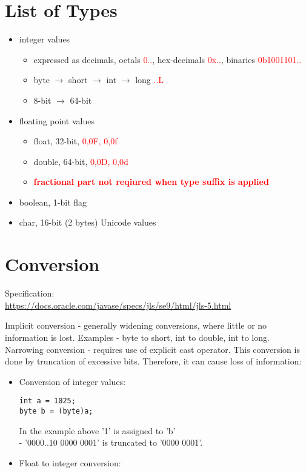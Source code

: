 \documentclass{report}
\begin{document}
\section{List of Types}
\begin{itemize}
	\item integer values
	\begin{itemize}
		\item expressed as decimals, octals \textcolor{red}{0..}, hex-decimals \textcolor{red}{0x..}, binaries \textcolor{red}{0b1001101..}
		\item byte $\rightarrow$ short $\rightarrow$ int $\rightarrow$ long \textcolor{red}{..L}
		\item 8-bit $\rightarrow$ 64-bit
	\end{itemize}
	
	\item floating point values
	\begin{itemize}
		\item float, 32-bit, \textcolor{red}{0,0F, 0,0f}
		\item double, 64-bit, \textcolor{red}{0,0D, 0,0d}
		\item \textbf{\textcolor{red}{fractional part not reqiured when type suffix is applied}}
	\end{itemize}
	
	\item boolean, 1-bit flag
	\item char, 16-bit (2 bytes) Unicode values
\end{itemize}


\section{Conversion}
Specification:\\
\url{https://docs.oracle.com/javase/specs/jls/se9/html/jls-5.html}\\
\par
Implicit conversion - generally widening conversions, where little or no information is lost. Examples - byte to short, int to double, int to long.\\
Narrowing conversion - requires use of explicit cast operator. This conversion is done by truncation of excessive bits. Therefore, it can cause loss  of information:
\begin{itemize}
\item Conversion of integer values:
\begin{verbatim}
int a = 1025;
byte b = (byte)a;
\end{verbatim}
In the example above '1' is assigned to 'b'\\
- '0000..10 0000 0001' is truncated to '0000 0001'.
\item Float to integer conversion:
\end{itemize}
\end{document}

